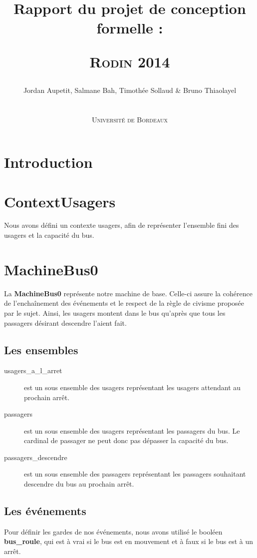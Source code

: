\documentclass[a4paper,titlepage]{report}
\title{Rapport du projet de conception formelle :
	\begin{center}
		\textsc{Rodin 2014}
	\end{center}
}
\author{Jordan Aupetit, Salmane Bah, Timothée Sollaud \& Bruno Thiaolayel\\
	\\
	\\ \textsc{Université de Bordeaux}
}
\begin{document}
	\maketitle
	\tableofcontents
	\newpage
	\thispagestyle{empty}	
	\newpage
\markboth{}{}
\section{Introduction}
	

\section{ContextUsagers}
	Nous avons défini un contexte usagers, afin de représenter l'ensemble fini des usagers et la capacité du bus.\\

\section{MachineBus0}
	La \textbf{MachineBus0} représente notre machine de base. Celle-ci assure la cohérence de l'enchaînement des événements et le respect de la règle de civisme proposée par le sujet. Ainsi, les usagers montent dans le bus qu'après que tous les passagers désirant descendre l'aient fait.\\
	
	\subsection{Les ensembles}
		\begin{description}
			\item[usagers\_a\_l\_arret] est un sous ensemble des usagers représentant les usagers attendant au prochain arrêt.\\
			\item[passagers] est un sous ensemble des usagers représentant les passagers du bus. Le cardinal de passager ne peut donc pas dépasser la capacité du bus.\\
			\item[passagers\_descendre] est un sous ensemble des passagers représentant les passagers souhaitant descendre du bus au prochain arrêt.\\
		\end{description}
		
	\subsection{Les événements}
		Pour définir les gardes de nos événements, nous avons utilisé le booléen \textbf{bus\_roule}, qui est à vrai si le bus est en mouvement et à faux si le bus est à un arrêt.\\
		
\end{document}
